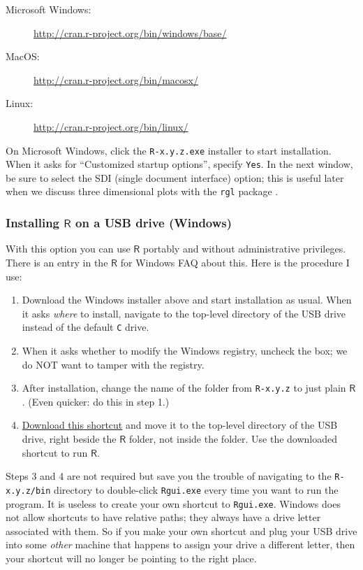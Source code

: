 \documentclass[captions=tableheading]{scrbook}
\begin{document}
\begin{description}
\item[Microsoft Windows:] \href{http://cran.r-project.org/bin/windows/base/}{http://cran.r-project.org/bin/windows/base/}
\item[MacOS:] \href{http://cran.r-project.org/bin/macosx/}{http://cran.r-project.org/bin/macosx/}
\item[Linux:] \href{http://cran.r-project.org/bin/linux/}{http://cran.r-project.org/bin/linux/}
\end{description}

On Microsoft Windows, click the \texttt{R-x.y.z.exe} installer to start installation. When it asks for ``Customized startup options'', specify \texttt{Yes}. In the next window, be sure to select the SDI (single document interface) option; this is useful later when we discuss three dimensional plots with the \texttt{rgl} package \cite{rgl}.
\subsubsection{Installing \(\mathsf{R}\) on a USB drive (Windows)}
\label{sec-2-1-1-1}


With this option you can use \(\mathsf{R}\) portably and without administrative privileges. There is an entry in the \(\mathsf{R}\) for Windows FAQ about this. Here is the procedure I use:  
\begin{enumerate}
\item Download the Windows installer above and start installation as usual. When it asks \emph{where} to install, navigate to the top-level directory of the USB drive instead of the default \texttt{C} drive.
\item When it asks whether to modify the Windows registry, uncheck the box; we do NOT want to tamper with the registry.
\item After installation, change the name of the folder from \texttt{R-x.y.z} to just plain \(\mathsf{R}\). (Even quicker: do this in step 1.)
\item \href{http://ipsur.r-forge.r-project.org/book/download/R.exe}{Download this shortcut} and move it to the top-level directory of the USB drive, right beside the \(\mathsf{R}\) folder, not inside the folder. Use the downloaded shortcut to run \(\mathsf{R}\).
\end{enumerate}

Steps 3 and 4 are not required but save you the trouble of navigating to the \texttt{R-x.y.z/bin} directory to double-click \texttt{Rgui.exe} every time you want to run the program. It is useless to create your own shortcut to \texttt{Rgui.exe}. Windows does not allow shortcuts to have relative paths; they always have a drive letter associated with them. So if you make your own shortcut and plug your USB drive into some \emph{other} machine that happens to assign your drive a different letter, then your shortcut will no longer be pointing to the right place. 
\end{document}
